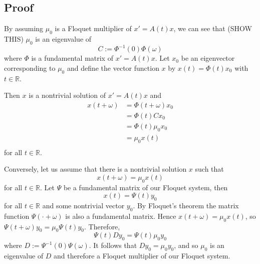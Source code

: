 \documentclass[a4paper]{article}
\begin{document}
\subsection{Proof}

By assuming $\mu_0$ is a Floquet multiplier of $x' = A(t)x$, we can see that (SHOW THIS) $\mu_0$ is an eigenvalue of 
\begin{equation*}
    C := \Phi^{-1}(0)\Phi(\omega)
\end{equation*}
where $\Phi$ is a fundamental matrix of $x' = A(t)x$. Let $x_0$ be an eigenvector corresponding to $\mu_0$ and define the vector function $x$ by $x(t) = \Phi(t)x_0$ with $t \in \mathbb{R}$.

Then $x$ is a nontrivial solution of $x' = A(t)x$ and \begin{equation*}
\begin{split}
    x(t + \omega) &= \Phi(t + \omega) x_0 \\
                  &= \Phi(t) C x_0\\
                  &= \Phi(t) \mu_0 x_0 \\
                  &= \mu_0 x(t) \\
\end{split}
\end{equation*}
for all $t \in \mathbb{R}$.

Conversely, let us assume that there is a nontrivial solution $x$ such that \begin{equation*}
    x(t + \omega) = \mu_0 x(t)
\end{equation*}
for all $t \in \mathbb{R}$. Let $\Psi$ be a fundamental matrix of our Floquet system, then \begin{equation*}
    x(t) = \Psi(t) y_0
\end{equation*}
for all $t \in \mathbb{R}$ and some nontrivial vector $y_0$. By Floquet's theorem the matrix function $\Psi(\cdot + \omega)$ is also a fundamental matrix. Hence $x(t + \omega) = \mu_0 x(t)$, so $\Psi(t + \omega)y_0 = \mu_0 \Psi(t) y_0$. Therefore,\begin{equation*}
    \Psi(t) D y_0 = \Psi(t) \mu_0 y_0
\end{equation*}
where $D := \Psi^{-1}(0) \Psi(\omega)$. It follows that $D y_0 = \mu_0 y_0$, and so $\mu_0$ is an eigenvalue of $D$ and therefore a Floquet multiplier of our Floquet system.
\end{document}
